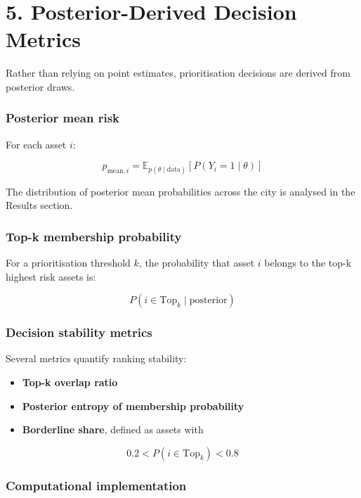 \documentclass[
]{article}
\providecommand{\tightlist}{%
  \setlength{\itemsep}{0pt}\setlength{\parskip}{0pt}}
\begin{document}
\section{5. Posterior-Derived Decision
Metrics}\label{posterior-derived-decision-metrics}

Rather than relying on point estimates, prioritisation decisions are
derived from posterior draws.

\subsubsection{Posterior mean risk}\label{posterior-mean-risk}

For each asset \(i\):

\[
p_{\text{mean}, i}
=
\mathbb{E}_{p(\theta \mid \text{data})}
\left[
P(Y_i = 1 \mid \theta)
\right]
\]

The distribution of posterior mean probabilities across the city is
analysed in the Results section.

\subsubsection{Top-k membership
probability}\label{top-k-membership-probability}

For a prioritisation threshold \(k\), the probability that asset \(i\)
belongs to the top-k highest risk assets is:

\[
P(i \in \text{Top}_k \mid \text{posterior})
\]

\subsubsection{Decision stability
metrics}\label{decision-stability-metrics}

Several metrics quantify ranking stability:

\begin{itemize}
\tightlist
\item
  \textbf{Top-k overlap ratio}
\item
  \textbf{Posterior entropy of membership probability}
\item
  \textbf{Borderline share}, defined as assets with
\end{itemize}

\[
0.2 < P(i \in \text{Top}_k) < 0.8
\]

\subsubsection{Computational
implementation}\label{computational-implementation}
\end{document}
